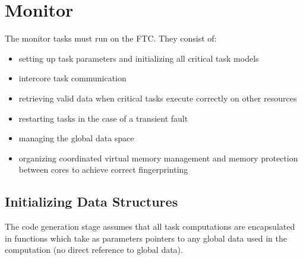 % 
% 
% 
	



% 
% 
% 


\section{Monitor}

The monitor tasks must run on the FTC. They consist of:
\begin{itemize}
  \item setting up task parameters and initializing all critical task models
  \item intercore task communication
  \item retrieving valid data when critical tasks execute correctly on other resources
  \item restarting tasks in the case of a transient fault
  \item managing the global data space
  \item organizing coordinated virtual memory management and memory protection between cores to achieve correct fingerprinting
\end{itemize}

\subsection{Initializing Data Structures}

The code generation stage assumes that all task computations are encapsulated in functions which take as parameters pointers to any global data used in the computation (no direct reference to global data).


